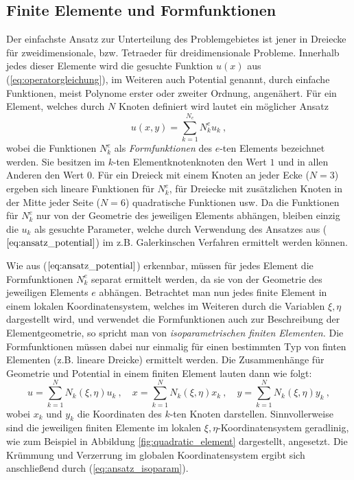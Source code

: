 \subsection{Finite Elemente und Formfunktionen}
\label{sec:finite_elements_and_shape_functions}
Der einfachste Ansatz zur Unterteilung des Problemgebietes ist jener in Dreiecke für zweidimensionale, bzw. Tetraeder für dreidimensionale Probleme. Innerhalb jedes dieser Elemente wird die gesuchte Funktion $u(x)$ aus (\ref{eq:operatorgleichung}), im Weiteren auch Potential genannt, durch einfache Funktionen, meist Polynome erster oder zweiter Ordnung, angenähert.\newline
Für ein Element, welches durch $N$ Knoten definiert wird lautet ein möglicher Ansatz 
\begin{equation}
\label{eq:ansatz_potential}
u(x,y) = \sum_{k = 1}^{N_e}N_k^e u_k \ ,
\end{equation}
wobei die Funktionen $N_k^e$ als \textit{Formfunktionen} des $e$-ten Elements bezeichnet werden. Sie besitzen im $k$-ten Elementknotenknoten den Wert $1$ und in allen Anderen den Wert $0$. \newline
Für ein Dreieck mit einem Knoten an jeder Ecke ($N = 3$) ergeben sich lineare Funktionen für $N_k^e$, für Dreiecke mit zusätzlichen Knoten in der Mitte jeder Seite ($N=6$) quadratische Funktionen usw. \newline
Da die Funktionen für $N_k^e$ nur von der Geometrie des jeweiligen Elements abhängen, bleiben einzig die $u_k$ als gesuchte Parameter, welche durch Verwendung des Ansatzes aus ($\ref{eq:ansatz_potential}$) im z.B. Galerkinschen Verfahren ermittelt werden können.\newline

Wie aus ($\ref{eq:ansatz_potential}$) erkennbar, müssen für jedes Element die Formfunktionen $N_k^e$ separat ermittelt werden, da sie von der Geometrie des jeweiligen Elements $e$ abhängen. Betrachtet man nun jedes finite Element in einem lokalen Koordinatensystem, welches im Weiteren durch die Variablen $\xi,\eta$ dargestellt wird, und verwendet die Formfunktionen auch zur Beschreibung der Elementgeometrie, so spricht man von \textit{isoparametrischen finiten Elementen.}\newline
Die Formfunktionen müssen dabei nur einmalig für einen bestimmten Typ von finten Elementen (z.B. lineare Dreicke) ermittelt werden. Die Zusammenhänge für Geometrie und Potential in einem finiten Element lauten dann wie folgt:
\begin{equation}
\label{eq:ansatz_isoparam}
u = \sum_{k = 1}^{N} N_k(\xi, \eta) u_k\ , \quad x = \sum_{k = 1}^{N} N_k(\xi, \eta) x_k \ , \quad y = \sum_{k = 1}^{N} N_k(\xi, \eta) y_k \ ,
\end{equation}
wobei $x_k$ und $y_k$ die Koordinaten des $k$-ten Knoten darstellen. Sinnvollerweise sind die jeweiligen finiten Elemente im lokalen $\xi,\eta$-Koordinatensystem geradlinig, wie zum Beispiel in Abbildung \ref{fig:quadratic_element} dargestellt, angesetzt. Die Krümmung und Verzerrung im globalen Koordinatensystem ergibt sich anschließend durch (\ref{eq:ansatz_isoparam}).



